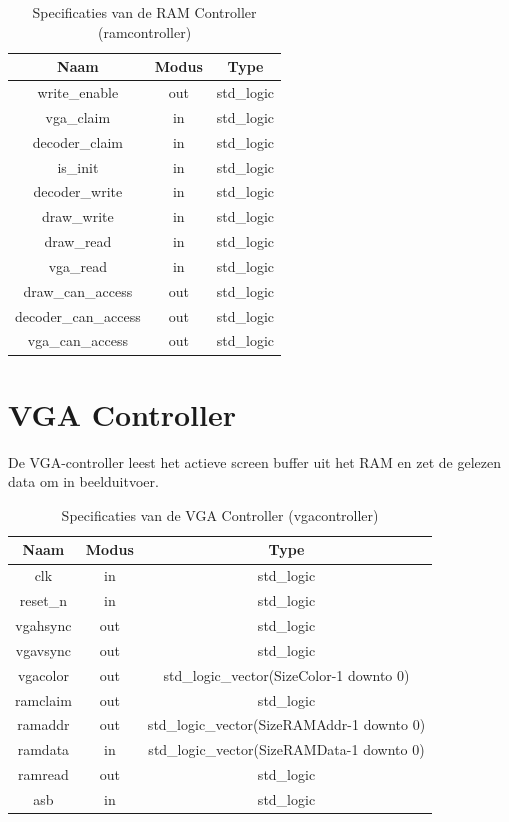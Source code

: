 \documentclass{scrreprt} %
\begin{document}
\begin{table}[H]
\centering
\caption{Specificaties van de RAM Controller (ramcontroller)}
\label{tab:spec-ramcontroller}
\begin{tabular}{c c c}
	\hline\hline
 	Naam & Modus & Type\\
 	\hline	
	write\_enable & out & std\_logic\\
	vga\_claim & in & std\_logic\\
	decoder\_claim & in & std\_logic\\
	is\_init & in & std\_logic\\
	decoder\_write & in & std\_logic\\
	draw\_write & in & std\_logic\\
	draw\_read & in & std\_logic\\
	vga\_read & in & std\_logic\\
	draw\_can\_access & out & std\_logic\\
	decoder\_can\_access & out & std\_logic\\
	vga\_can\_access & out & std\_logic\\
  	\hline
\end{tabular}
\end{table}

\section{VGA Controller}
De VGA-controller leest het actieve screen buffer uit het RAM en zet de gelezen data om in beelduitvoer.

\begin{table}[H]
\centering
\caption{Specificaties van de VGA Controller (vgacontroller)}
\label{tab:spec-vgacontroller}
\begin{tabular}{c c c}
	\hline\hline
 	Naam & Modus & Type\\
 	\hline	
	clk & in & std\_logic \\ 
	reset\_n & in & std\_logic \\ 
	vgahsync & out & std\_logic \\ 
	vgavsync & out & std\_logic \\ 
	vgacolor & out & std\_logic\_vector(SizeColor-1 downto 0) \\
	ramclaim & out & std\_logic \\ 
	ramaddr & out & std\_logic\_vector(SizeRAMAddr-1 downto 0) \\
	ramdata & in & std\_logic\_vector(SizeRAMData-1 downto 0) \\ 
	ramread & out & std\_logic \\
	asb & in & std\_logic \\
  	\hline
\end{tabular}
\end{table}
\end{document}
